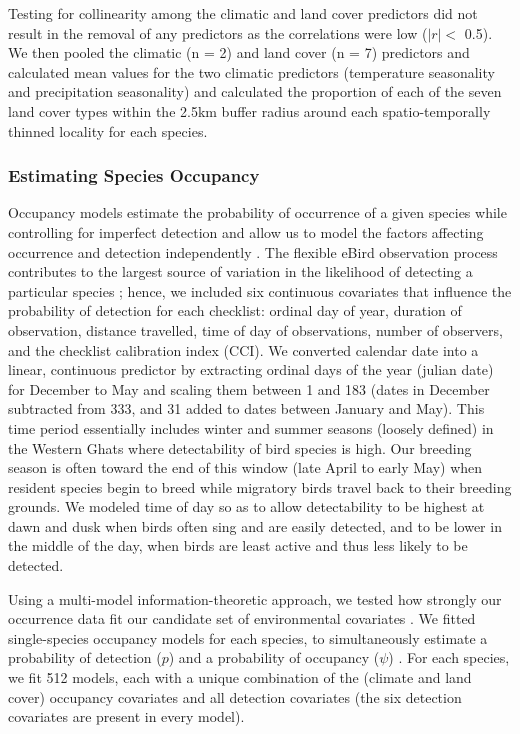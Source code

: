 Testing for collinearity among the climatic and land cover predictors did not result in the removal of any predictors as the correlations were low ($|r| <$ 0.5).
We then pooled the climatic (n = 2) and land cover (n = 7) predictors and calculated mean values for the two climatic predictors (temperature seasonality and precipitation seasonality) and calculated the proportion of each of the seven land cover types within the 2.5km buffer radius around each spatio-temporally thinned locality for each species.

\subsubsection*{Estimating Species Occupancy}

Occupancy models estimate the probability of occurrence of a given species while controlling for imperfect detection and allow us to model the factors affecting occurrence and detection independently \citep{mackenzie2017a,johnston2018}.
The flexible eBird observation process contributes to the largest source of variation in the likelihood of detecting a particular species \citep{johnston2021a}; hence, we included six continuous covariates that influence the probability of detection for each checklist: ordinal day of year, duration of observation, distance travelled, time of day of observations, number of observers, and the checklist calibration index (CCI).
We converted calendar date into a linear, continuous predictor by extracting ordinal days of the year (julian date) for December to May and scaling them between 1 and 183 (dates in December subtracted from 333, and 31 added to dates between January and May).
This time period essentially includes winter and summer seasons (loosely defined) in the Western Ghats where detectability of bird species is high.
Our breeding season is often toward the end of this window (late April to early May) when resident species begin to breed while migratory birds travel back to their breeding grounds.
We modeled time of day so as to allow detectability to be highest at dawn and dusk when birds often sing and are easily detected, and to be lower in the middle of the day, when birds are least active and thus less likely to be detected.

Using a multi-model information-theoretic approach, we tested how strongly our occurrence data fit our candidate set of environmental covariates \citep{burnham2002}.
We fitted single-species occupancy models for each species, to simultaneously estimate a probability of detection ($p$) and a probability of occupancy ($\psi$) \citep{mackenzie2002,fiske2011}.
For each species, we fit 512 models, each with a unique combination of the (climate and land cover) occupancy covariates and all detection covariates (the six detection covariates are present in every model).


